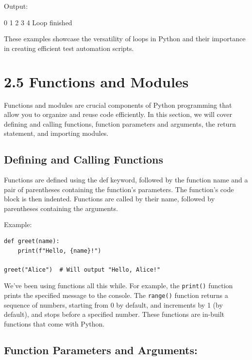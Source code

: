 \documentclass[
  paper=a4,
  ,captions=tableheading
]{scrartcl}
\newenvironment{Shaded}{}{}
\newcommand{\ExtensionTok}[1]{#1}
\newcommand{\NormalTok}[1]{#1}
\begin{document}
Output:

\begin{Shaded}
\begin{Highlighting}[]
\ExtensionTok{0}
\ExtensionTok{1}
\ExtensionTok{2}
\ExtensionTok{3}
\ExtensionTok{4}
\ExtensionTok{Loop}\NormalTok{ finished}
\end{Highlighting}
\end{Shaded}

These examples showcase the versatility of loops in Python and their
importance in creating efficient test automation scripts.

\hypertarget{functions-and-modules}{%
\section{2.5 Functions and Modules}\label{functions-and-modules}}

Functions and modules are crucial components of Python programming that
allow you to organize and reuse code efficiently. In this section, we
will cover defining and calling functions, function parameters and
arguments, the return statement, and importing modules.

\hypertarget{defining-and-calling-functions}{%
\subsection{Defining and Calling
Functions}\label{defining-and-calling-functions}}

Functions are defined using the def keyword, followed by the function
name and a pair of parentheses containing the function's parameters. The
function's code block is then indented. Functions are called by their
name, followed by parentheses containing the arguments.

Example:

\begin{verbatim}
def greet(name):
    print(f"Hello, {name}!")

greet("Alice")  # Will output "Hello, Alice!"
\end{verbatim}

We've been using functions all this while. For example, the
\texttt{print()} function prints the specified message to the console.
The \texttt{range()} function returns a sequence of numbers, starting
from 0 by default, and increments by 1 (by default), and stops before a
specified number. These functions are in-built functions that come with
Python.

\hypertarget{function-parameters-and-arguments}{%
\subsection{Function Parameters and
Arguments:}\label{function-parameters-and-arguments}}
\end{document}
